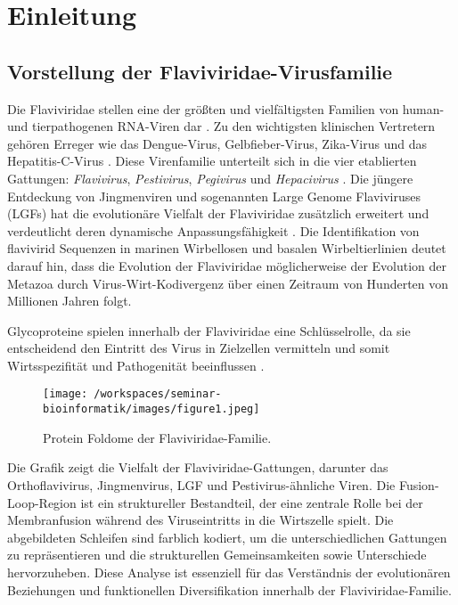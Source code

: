 \chapter{Einleitung} \label{chap:einleitung}

\section{Vorstellung der Flaviviridae-Virusfamilie}
\label{sec:vorstellung-der-flaviviridae-virusfamilie}

Die Flaviviridae stellen eine der größten und vielfältigsten Familien von human- und tierpathogenen RNA-Viren dar \autocite{Simmonds2017}. Zu den wichtigsten klinischen Vertretern gehören Erreger wie das Dengue-Virus, Gelbfieber-Virus, Zika-Virus und das Hepatitis-C-Virus \autocite{Mackenzie2004}. Diese Virenfamilie unterteilt sich in die vier etablierten Gattungen: \textit{Flavivirus}, \textit{Pestivirus}, \textit{Pegivirus} und \textit{Hepacivirus} \autocite{Simmonds2017}. Die jüngere Entdeckung von Jingmenviren und sogenannten Large Genome Flaviviruses (LGFs) hat die evolutionäre Vielfalt der Flaviviridae zusätzlich erweitert und verdeutlicht deren dynamische Anpassungsfähigkeit \autocite{shiDivergentVirusesDiscovered2015}. Die Identifikation von flavivirid Sequenzen in marinen Wirbellosen und basalen Wirbeltierlinien deutet darauf hin, dass die Evolution der Flaviviridae möglicherweise der Evolution der Metazoa durch Virus-Wirt-Kodivergenz über einen Zeitraum von Hunderten von Millionen Jahren folgt.

Glycoproteine spielen innerhalb der Flaviviridae eine Schlüsselrolle, da sie entscheidend den Eintritt des Virus in Zielzellen vermitteln und somit Wirtsspezifität und Pathogenität beeinflussen \autocite{Mukhopadhyay2005}.

\begin{figure}[H]
    \centering
    \texttt{[image: /workspaces/seminar-bioinformatik/images/figure1.jpeg]}
    \caption{Protein Foldome der Flaviviridae-Familie.}
    \label{fig:figure1-orginal}
\end{figure}

Die Grafik zeigt die Vielfalt der Flaviviridae-Gattungen, darunter das Orthoflavivirus, Jingmenvirus, LGF und Pestivirus-ähnliche Viren. Die Fusion-Loop-Region ist ein struktureller Bestandteil, der eine zentrale Rolle bei der Membranfusion während des Viruseintritts in die Wirtszelle spielt. Die abgebildeten Schleifen sind farblich kodiert, um die unterschiedlichen Gattungen zu repräsentieren und die strukturellen Gemeinsamkeiten sowie Unterschiede hervorzuheben. Diese Analyse ist essenziell für das Verständnis der evolutionären Beziehungen und funktionellen Diversifikation innerhalb der Flaviviridae-Familie. \autocite{mifsudMappingGlycoproteinStructure2024}


